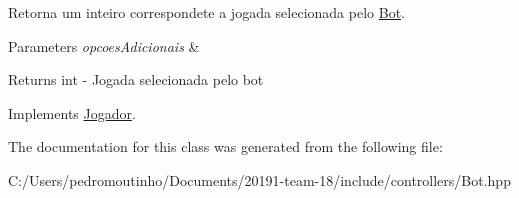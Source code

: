 Retorna um inteiro correspondete a jogada selecionada pelo \mbox{\hyperlink{class_bot}{Bot}}. 


\begin{DoxyParams}{Parameters}
{\em opcoes\+Adicionais} & \\
\hline
\end{DoxyParams}
\begin{DoxyReturn}{Returns}
int -\/ Jogada selecionada pelo bot 
\end{DoxyReturn}


Implements \mbox{\hyperlink{class_jogador}{Jogador}}.



The documentation for this class was generated from the following file\+:\begin{DoxyCompactItemize}
\item 
C\+:/\+Users/pedromoutinho/\+Documents/20191-\/team-\/18/include/controllers/Bot.\+hpp\end{DoxyCompactItemize}
